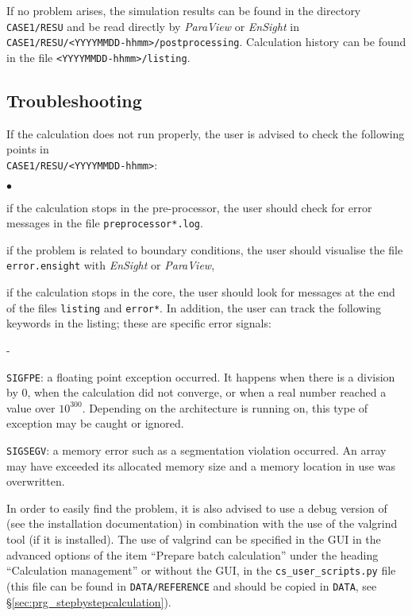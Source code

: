 If no problem arises, the simulation results can be found in the directory \texttt{CASE1/RESU} and be read directly by {\em ParaView} or {\em EnSight} in \texttt{CASE1/RESU/<YYYYMMDD-hhmm>/postprocessing}. Calculation history can be found in the file \texttt{<YYYYMMDD-hhmm>/listing}.

\subsection{Troubleshooting}
If the calculation does not run properly, the user is advised to check the
following points in\\
\texttt{CASE1/RESU/<YYYYMMDD-hhmm>}:
\begin{list}{$\bullet$}{}
\item  if the calculation stops in the pre-processor, the user should check for error messages in the file \texttt{preprocessor*.log}.
\item if the problem is related to boundary conditions, the user should visualise the file \texttt{error.ensight} with {\em EnSight} or {\em ParaView},
\item if the calculation stops in the \CS core, the user should look for messages at the end of the files \texttt{listing} and \texttt{error*}. In addition, the user can track the following keywords in the listing; these are specific error signals:
  \begin{list}{-}{}
  \item  \texttt{SIGFPE}: a floating point exception occurred. It happens when there is a division by 0, when the calculation did not converge, or when a real number reached a value over $10^{300}$. Depending on the architecture \CS is running
on, this type of exception may be caught or ignored.
  \item  \texttt{SIGSEGV}: a memory error such as a segmentation violation occurred. An array may have exceeded its allocated memory size and a memory location in use was overwritten.
  \end{list}
In order to easily find the problem, it is also advised to use a debug version of \CS (see the installation documentation) in combination with the use of the valgrind tool (if it is installed). The use of valgrind can be specified in the GUI in the advanced options of the item ``Prepare batch calculation'' under the heading ``Calculation management'' or without the GUI, in the \texttt{cs\_user\_scripts.py} file (this file can be found in \texttt{DATA/REFERENCE} and should be copied in \texttt{DATA}, see \S\ref{sec:prg_stepbystepcalculation}).
\end{list}
